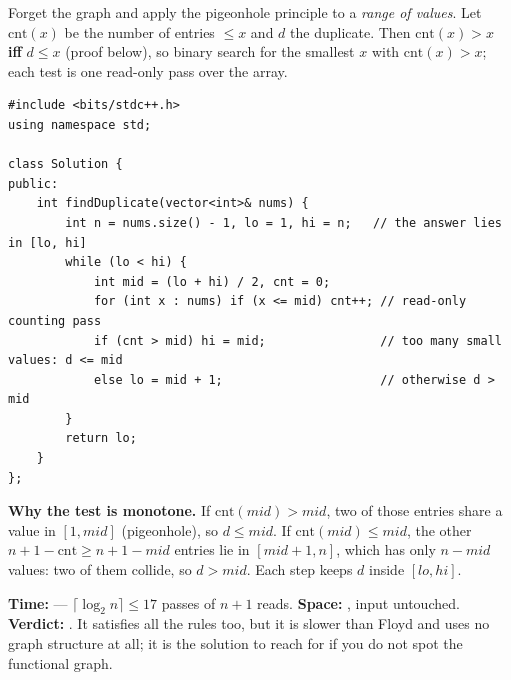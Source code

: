 \begin{alternativebox}
Forget the graph and apply the pigeonhole principle to a \emph{range of values}. Let $\text{cnt}(x)$ be the number of entries $\le x$ and $d$ the duplicate. Then $\text{cnt}(x) > x$ \textbf{iff} $d \le x$ (proof below), so binary search for the smallest $x$ with $\text{cnt}(x) > x$; each test is one read-only pass over the array.

\begin{lstlisting}[style=cpp]
#include <bits/stdc++.h>
using namespace std;

class Solution {
public:
    int findDuplicate(vector<int>& nums) {
        int n = nums.size() - 1, lo = 1, hi = n;   // the answer lies in [lo, hi]
        while (lo < hi) {
            int mid = (lo + hi) / 2, cnt = 0;
            for (int x : nums) if (x <= mid) cnt++; // read-only counting pass
            if (cnt > mid) hi = mid;                // too many small values: d <= mid
            else lo = mid + 1;                      // otherwise d > mid
        }
        return lo;
    }
};
\end{lstlisting}

\textbf{Why the test is monotone.} If $\text{cnt}(\textit{mid}) > \textit{mid}$, two of those entries share a value in $[1, \textit{mid}]$ (pigeonhole), so $d \le \textit{mid}$. If $\text{cnt}(\textit{mid}) \le \textit{mid}$, the other $n + 1 - \text{cnt} \ge n + 1 - \textit{mid}$ entries lie in $[\textit{mid}+1, n]$, which has only $n - \textit{mid}$ values: two of them collide, so $d > \textit{mid}$. Each step keeps $d$ inside $[lo, hi]$.

\begin{diagrambox}
\end{diagrambox}

\begin{complexitybox}
\textbf{Time:}  --- $\lceil \log_2 n \rceil \le 17$ passes of $n+1$ reads. \textbf{Space:} , input untouched. \textbf{Verdict:} \ac{}. It satisfies all the rules too, but it is slower than Floyd and uses no graph structure at all; it is the solution to reach for if you do not spot the functional graph.
\end{complexitybox}
\end{alternativebox}

